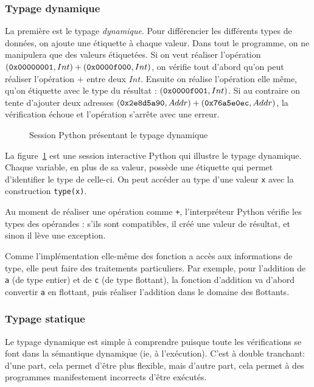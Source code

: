 \subsubsection{Typage dynamique}

La première est le typage \emph{dynamique}. Pour différencier les différents
types de données, on ajoute une étiquette à chaque valeur. Dans tout le
programme, on ne manipulera que des valeurs étiquetées. Si on veut réaliser
l'opération $(\texttt{0x00000001}, Int) + (\texttt{0x0000f000}, Int)$, on vérifie tout
d'abord qu'on peut réaliser l'opération $+$ entre deux $Int$. Ensuite on réalise
l'opération elle même, qu'on étiquette avec le type du résultat :
$(\texttt{0x0000f001}, Int)$. Si au contraire on tente d'ajouter deux adresses
$(\texttt{0x2e8d5a90}, Addr) + (\texttt{0x76a5e0ec}, Addr)$, la vérification échoue et
l'opération s'arrête avec une erreur.

\begin{figure}
  \caption{Session Python présentant le typage dynamique}
  \label{fig:typage-dynamique}
\end{figure}

La figure~\ref{fig:typage-dynamique} est une session interactive Python qui
illustre le typage dynamique. Chaque variable, en plus de sa valeur, possède une
étiquette qui permet d'identifier le type de celle-ci. On peut accéder au type
d'une valeur \texttt{x} avec la construction \texttt{type(x)}.

Au moment de réaliser une opération comme \texttt{+}, l'interpréteur Python
vérifie les types des opérandes : s'ils sont compatibles, il créé une valeur de
résultat, et sinon il lève une exception.

Comme l'implémentation elle-même des fonction a accès aux informations de type,
elle peut faire des traitements particuliers. Par exemple, pour l'addition de
\texttt{a} (de type entier) et de \texttt{c} (de type flottant), la fonction
d'addition va d'abord convertir \texttt{a} en flottant, puis réaliser l'addition
dans le domaine des flottants.

\subsubsection{Typage statique}

Le typage dynamique est simple à comprendre puisque toute les vérifications se
font dans la sémantique dynamique (ie, à l'exécution). C'est à double tranchant:
d'une part, cela permet d'être plus flexible, mais d'autre part, cela permet à
des programmes manifestement incorrects d'être exécutés.

